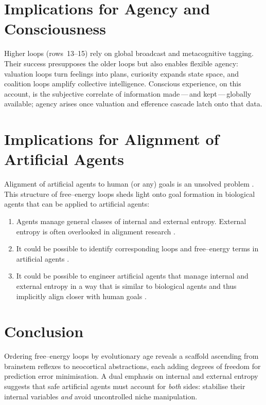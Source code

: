 \documentclass[11pt]{article}
\begin{document}
\section{Implications for Agency and Consciousness}
Higher loops (rows~13--15) rely on global broadcast and metacognitive tagging.  
Their success presupposes the older loops but also enables flexible agency: valuation loops turn feelings into plans, 
curiosity expands state space, and coalition loops amplify collective intelligence.  
Conscious experience, on this account, is the subjective correlate of information made\,---\,and kept\,---\,globally available; 
agency arises once valuation and efference cascade latch onto that data.  

\section{Implications for Alignment of Artificial Agents}
Alignment of artificial agents to human (or any) goals is an unsolved problem \cite{russell2019human, ngo2022alignment, miri2024problem}.
This structure of free--energy loops sheds light onto goal formation in biological agents that can be applied to artificial agents:
\begin{enumerate}
\item Agents manage general classes of internal and external entropy. External entropy is often overlooked in alignment research \cite{critch2020ai, hubinger2019risks}.
\item It could be possible to identify corresponding loops and free--energy terms in artificial agents \cite{friston2022designing, sajid2021active}.
\item It could be possible to engineer artificial agents that manage internal and external entropy in a way that is similar to biological agents and thus implicitly align closer with human goals \cite{millidge2020deep, ramstead2022bayesian}.
\end{enumerate}

\section{Conclusion}
Ordering free--energy loops by evolutionary age reveals a scaffold ascending from brainstem reflexes to neocortical abstractions, 
each adding degrees of freedom for prediction error minimisation.  
A dual emphasis on internal and external entropy suggests that safe artificial agents must account for \emph{both} sides: 
stabilise their internal variables \emph{and} avoid uncontrolled niche manipulation.  
\end{document}
